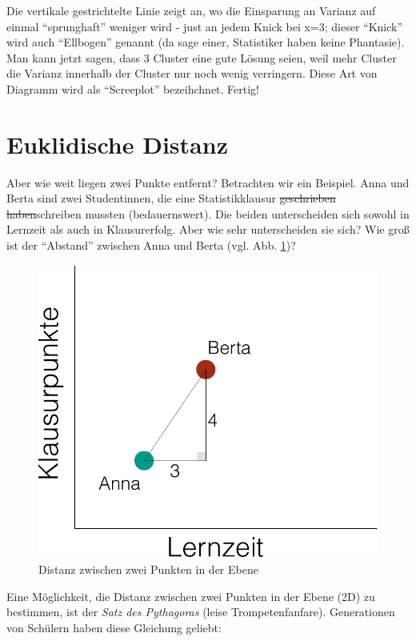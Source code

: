 \documentclass[12pt,ngerman,]{book}
\begin{document}
Die vertikale gestrichtelte Linie zeigt an, wo die Einsparung an Varianz
auf einmal ``sprunghaft'' weniger wird - just an jedem Knick bei x=3;
dieser ``Knick'' wird auch ``Ellbogen'' genannt (da sage einer,
Statistiker haben keine Phantasie). Man kann jetzt sagen, dass 3 Cluster
eine gute Lösung seien, weil mehr Cluster die Varianz innerhalb der
Cluster nur noch wenig verringern. Diese Art von Diagramm wird als
``Screeplot'' bezeihchnet. Fertig!

\section{Euklidische Distanz}\label{euklidische-distanz}

Aber wie weit liegen zwei Punkte entfernt? Betrachten wir ein Beispiel.
Anna und Berta sind zwei Studentinnen, die eine Statistikklausur
\sout{geschrieben haben}schreiben mussten (bedauernswert). Die beiden
unterscheiden sich sowohl in Lernzeit als auch in Klausurerfolg. Aber
wie sehr unterscheiden sie sich? Wie groß ist der ``Abstand'' zwischen
Anna und Berta (vgl. Abb. \ref{fig:distanz})?

\begin{figure}

{\centering \includegraphics[width=0.7\linewidth]{images/cluster/distanz_crop} 

}

\caption{Distanz zwischen zwei Punkten in der Ebene}\label{fig:distanz}
\end{figure}

Eine Möglichkeit, die Distanz zwischen zwei Punkten in der Ebene (2D) zu
bestimmen, ist der \emph{Satz des Pythagoras} (leise Trompetenfanfare).
Generationen von Schülern haben diese Gleichung geliebt:
\end{document}
